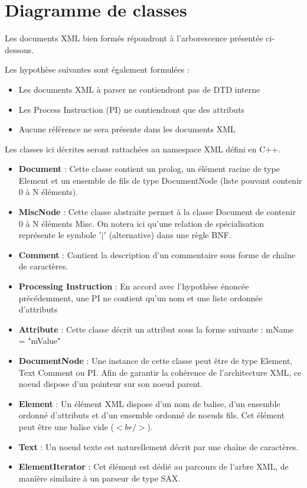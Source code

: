 \chapter{Diagramme de classes}
Les documents XML bien formés répondront à l'arborescence présentée ci-dessous.

Les hypothèse suivantes sont également formulées :
\begin{itemize}
    \item Les documents XML à parser ne contiendront pas de DTD interne
    \item Les Process Instruction (PI) ne contiendront que des attributs
    \item Aucune référence ne sera présente dans les documents XML\\
\end{itemize}

Les classes ici décrites seront rattachées au namespace XML défini en C++.

\begin{itemize}
    \addtolength{\itemindent}{10px}
    \item \textbf{Document} : Cette classe contient un prolog, un élément racine de type Element et un ensemble de fils de type DocumentNode (liste pouvant contenir 0 à N éléments).
    \item \textbf{MiscNode} : Cette classe abstraite permet à la classe Document de contenir 0 à N éléments Misc.
    On notera ici qu'une relation de spécialisation représente le symbole $'|'$ (alternative) dans une règle BNF.
    \item \textbf{Comment} : Contient la description d'un commentaire sous forme de chaîne de caractères.
    \item \textbf{Processing Instruction} : En accord avec l'hypothèse énoncée précédemment, une PI ne contient qu'un nom et une liste ordonnée d'attributs
    \item \textbf{Attribute} : Cette classe décrit un attribut sous la forme suivante : mName = "mValue"
    \item \textbf{DocumentNode} : Une instance de cette classe peut être de type Element, Text Comment ou PI. Afin de garantir la cohérence de l'architecture XML, ce noeud dispose d'un pointeur sur son noeud parent.
    \item \textbf{Element} : Un élément XML dispose d'un nom de balise, d'un ensemble ordonné d'attributs et d'un ensemble ordonné de noeuds fils. Cet élément peut être une balise vide ($<br/>$).
    \item \textbf{Text} : Un noeud texte est naturellement décrit par une chaîne de caractères.
    \item \textbf{ElementIterator} : Cet élément est dédié au parcours de l'arbre XML, de manière similaire à un parseur de type SAX.
\end{itemize}

